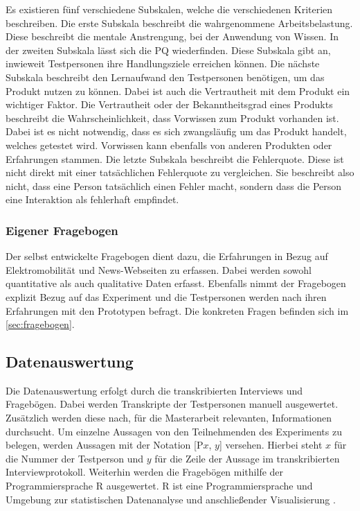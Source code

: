 Es existieren fünf verschiedene Subskalen, welche die verschiedenen Kriterien beschreiben.
Die erste Subskala beschreibt die wahrgenommene Arbeitsbelastung.
Diese beschreibt die mentale Anstrengung, bei der Anwendung von Wissen.
In der zweiten Subskala lässt sich die \ac{PQ} wiederfinden.
Diese Subskala gibt an, inwieweit Testpersonen ihre Handlungsziele erreichen können.
Die nächste Subskala beschreibt den Lernaufwand den Testpersonen benötigen, um das Produkt nutzen zu können.
Dabei ist auch die Vertrautheit mit dem Produkt ein wichtiger Faktor.
Die Vertrautheit oder der Bekanntheitsgrad eines Produkts beschreibt die Wahrscheinlichkeit, dass Vorwissen zum Produkt vorhanden ist.
Dabei ist es nicht notwendig, dass es sich zwangsläufig um das Produkt handelt, welches getestet wird.
Vorwissen kann ebenfalls von anderen Produkten oder Erfahrungen stammen.
Die letzte Subskala beschreibt die Fehlerquote.
Diese ist nicht direkt mit einer tatsächlichen Fehlerquote zu vergleichen.
Sie beschreibt also nicht, dass eine Person tatsächlich einen Fehler macht, sondern dass die Person eine Interaktion als fehlerhaft empfindet.

\subsubsection{Eigener Fragebogen}
Der selbst entwickelte Fragebogen dient dazu, die Erfahrungen in Bezug auf Elektromobilität und News-Webseiten zu erfassen.
Dabei werden sowohl quantitative als auch qualitative Daten erfasst.
Ebenfalls nimmt der Fragebogen explizit Bezug auf das Experiment und die Testpersonen werden nach ihren Erfahrungen mit den Prototypen befragt.
Die konkreten Fragen befinden sich im \autoref{sec:fragebogen}.

\subsection{Datenauswertung}
Die Datenauswertung erfolgt durch die transkribierten Interviews und Fragebögen.
Dabei werden Transkripte der Testpersonen manuell ausgewertet.
Zusätzlich werden diese nach, für die Masterarbeit relevanten, Informationen durchsucht.
Um einzelne Aussagen von den Teilnehmenden des Experiments zu belegen, werden Aussagen mit der Notation [P$x$, $y$] versehen.
Hierbei steht $x$ für die Nummer der Testperson und $y$ für die Zeile der Aussage im transkribierten Interviewprotokoll.
Weiterhin werden die Fragebögen mithilfe der Programmiersprache R ausgewertet.
R ist eine Programmiersprache und Umgebung zur statistischen Datenanalyse und anschließender Visualisierung \cite{rlang}.
